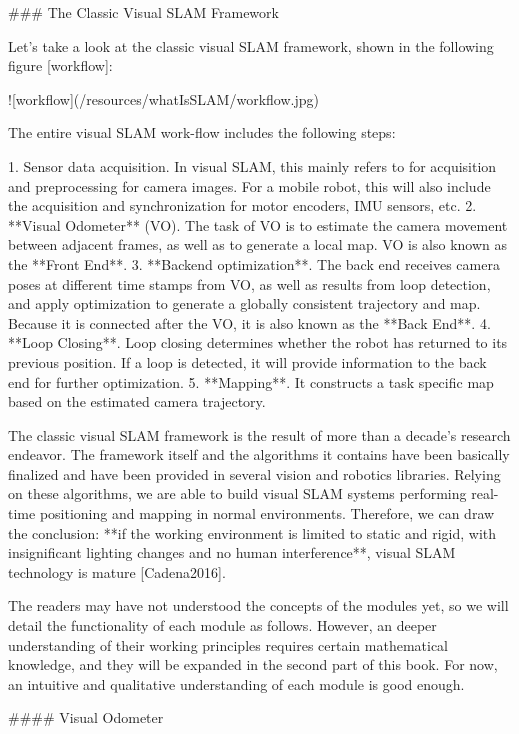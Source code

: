 ### The Classic Visual SLAM Framework

Let's take a look at the classic visual SLAM framework, shown in the following figure [workflow]:

![workflow](/resources/whatIsSLAM/workflow.jpg)

The entire visual SLAM work-flow includes the following steps:

1.  Sensor data acquisition. In visual SLAM, this mainly refers to for acquisition and preprocessing for camera images. For a mobile robot, this will also include the acquisition and synchronization for motor encoders, IMU sensors, etc.
2.  **Visual Odometer** (VO). The task of VO is to estimate the camera movement between adjacent frames, as well as to generate a local map. VO is also known as the **Front End**.
3. **Backend optimization**. The back end receives camera poses at different time stamps from VO, as well as results from loop detection, and apply optimization to generate a globally consistent trajectory and map. Because it is connected after the VO, it is also known as the **Back End**.
4. **Loop Closing**. Loop closing determines whether the robot has returned to its previous position. If a loop is detected, it will provide information to the back end for further optimization.
5. **Mapping**. It constructs a task specific map based on the estimated camera trajectory.

The classic visual SLAM framework is the result of more than a decade's research endeavor. The framework itself and the algorithms it contains have been basically finalized and have been provided in several vision and robotics libraries. Relying on these algorithms, we are able to build visual SLAM systems performing real-time positioning and mapping in normal environments. Therefore, we can draw the conclusion: **if the working environment is limited to static and rigid, with insignificant lighting changes and no human interference**, visual SLAM technology is mature [Cadena2016].

The readers may have not understood the concepts of the modules yet, so we will detail the functionality of each module as follows. However, an deeper understanding of their working principles requires certain mathematical knowledge, and they will be expanded in the second part of this book. For now, an intuitive and qualitative understanding of each module is good enough.

#### Visual Odometer

